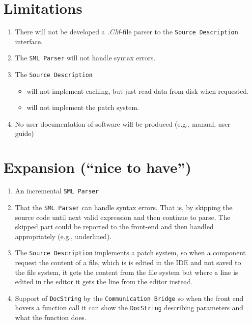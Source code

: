 \documentclass[a4paper,oneside]{memoir}
\begin{document}
\section{Limitations}

\begin{enumerate}
\item There will not be developed a \textit{.CM}-file parser to the
  \texttt{Source Description} interface.

\item The \texttt{SML Parser} will not handle syntax errors.

\item The \texttt{Source Description}

  \begin{itemize}
  \item will not implement caching, but just read data from disk when
    requested.

  \item will not implement the patch system.
  \end{itemize}

\item No user documentation of software will be produced (e.g.,
  manual, user guide)
\end{enumerate}


\section{Expansion (``nice to have'')}


\begin{enumerate}
\item An incremental \texttt{SML Parser}

\item That the \texttt{SML Parser} can handle syntax errors. That is,
  by skipping the source code until next valid expression and then
  continue to parse. The skipped part could be reported to the
  front-end and then handled appropriately (e.g., underlined).

\item The \texttt{Source Description} implements a patch system, so
  when a component request the content of a file, which is is edited
  in the IDE and not saved to the file system, it gets the content
  from the file system but where a line is edited in the editor it
  gets the line from the editor instead.

\item Support of \texttt{DocString} by the \texttt{Communication
    Bridge} so when the front end hovers a function call it can show
  the \texttt{DocString} describing parameters and what the function
  does.

\end{enumerate}
\end{document}
